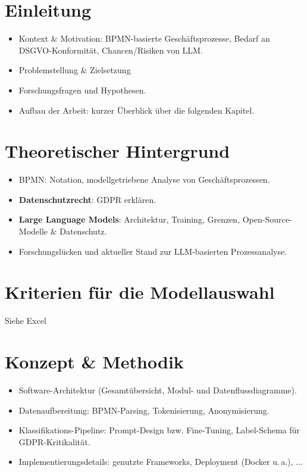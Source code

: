 \chapter{Einleitung}\label{chap:intro}
\begin{itemize}
    \item Kontext \& Motivation: BPMN-basierte Geschäftsprozesse, Bedarf an DSGVO-Konformität, Chancen/Risiken von \ac{LLM}.
    \item Problemstellung \& Zielsetzung
    \item Forschungsfragen und Hypothesen.
    \item Aufbau der Arbeit: kurzer Überblick über die folgenden Kapitel.
\end{itemize}

\chapter{Theoretischer Hintergrund}\label{chap:background}
\begin{itemize}
    \item \ac{BPMN}: Notation, modellgetriebene Analyse von Geschäftsprozessen.
    \item \textbf{Datenschutzrecht}: GDPR erklären.
    \item \textbf{Large Language Models}: Architektur, Training, Grenzen, Open-Source-Modelle \& Datenschutz.
    \item Forschungslücken und aktueller Stand zur LLM-basierten Prozessanalyse.
\end{itemize}

\chapter{Kriterien für die Modellauswahl}\label{chap:criteria}
Siehe Excel

\chapter{Konzept \& Methodik}\label{chap:method}
\begin{itemize}
    \item Software-Architektur (Gesamtübersicht, Modul- und Datenflussdiagramme).
    \item Datenaufbereitung: BPMN-Parsing, Tokenisierung, Anonymisierung.
    \item Klassifikations-Pipeline: Prompt-Design bzw. Fine-Tuning, Label-Schema für GDPR-Kritikalität.
    \item Implementierungsdetails: genutzte Frameworks, Deployment (Docker u.\,a.), ...
\end{itemize}

